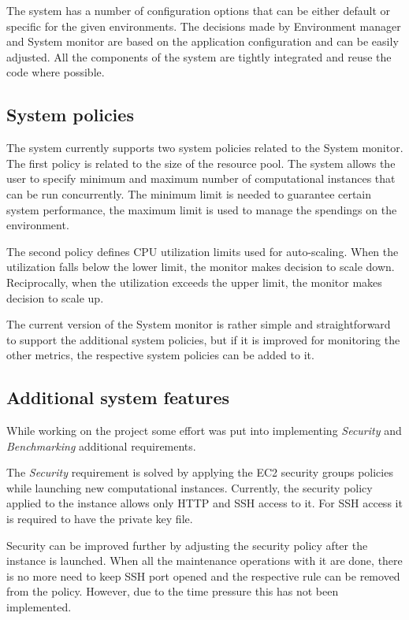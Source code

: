 \documentclass[conference]{IEEEtran}
\begin{document}
The system has a number of configuration options that can be either default or specific for the given environments. The decisions made by Environment manager and System monitor are based on the application configuration and can be easily adjusted. All the components of the system are tightly integrated and reuse the code where possible. 

\subsection{System policies}

The system currently supports two system policies related to the System monitor. The first policy is related to the size of the resource pool. The system allows the user to specify minimum and maximum number of computational instances that can be run concurrently. The minimum limit is needed to guarantee certain system performance, the maximum limit is used to manage the spendings on the environment.

The second policy defines CPU utilization limits used for auto-scaling. When the utilization falls below the lower limit, the monitor makes decision to scale down. Reciprocally, when the utilization exceeds the upper limit, the monitor makes decision to scale up. 

The current version of the System monitor is rather simple and straightforward to support the additional system policies, but if it is improved for monitoring the other metrics, the respective system policies can be added to it.

\subsection{Additional system features}

While working on the project some effort was put into implementing \emph{Security} and \emph{Benchmarking} additional requirements.

The \emph{Security} requirement is solved by applying the EC2 security groups policies while launching new computational instances. Currently, the security policy applied to the instance allows only HTTP and SSH access to it. For SSH access it is required to have the private key file. 

Security can be improved further by adjusting the security policy after the instance is launched. When all the maintenance operations with it are done, there is no more need to keep SSH port opened and the respective rule can be removed from the policy. However, due to the time pressure this has not been implemented.
\end{document}
